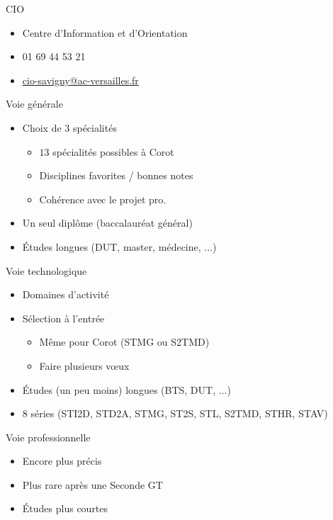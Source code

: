 \documentclass[17pt,xcolor=x11names]{beamer}
\begin{document}
\begin{frame}{CIO}
  \begin{itemize}
    \item Centre d'Information et d'Orientation
    \item 01 69 44 53 21
    \item
      \href{mailto:cio-savigny@ac-versailles.fr}{cio-savigny@ac-versailles.fr}
  \end{itemize}
\end{frame}

\begin{frame}{Voie générale}
  \begin{itemize}
    \item Choix de $3$ spécialités
      \begin{itemize}
        \item $13$ spécialités possibles à Corot
        \item Disciplines favorites / bonnes notes
        \item Cohérence avec le projet pro.
      \end{itemize}
    \item Un seul diplôme (baccalauréat général)
    \item Études longues (DUT, master, médecine, ...)
  \end{itemize}
\end{frame}

\begin{frame}{Voie technologique}
  \begin{itemize}
    \item Domaines d'activité
    \item Sélection à l'entrée
      \begin{itemize}
        \item Même pour Corot (STMG ou S2TMD)
        \item Faire plusieurs vœux
      \end{itemize}
    \item Études (un peu moins) longues (BTS, DUT, ...)
    \item $8$ séries (STI2D, STD2A, STMG, ST2S, STL, S2TMD, STHR, STAV)
  \end{itemize}
\end{frame}

\begin{frame}{Voie professionnelle}
  \begin{itemize}
    \item Encore plus précis
    \item Plus rare après une Seconde GT
    \item Études plus courtes
  \end{itemize}
\end{frame}
\end{document}
